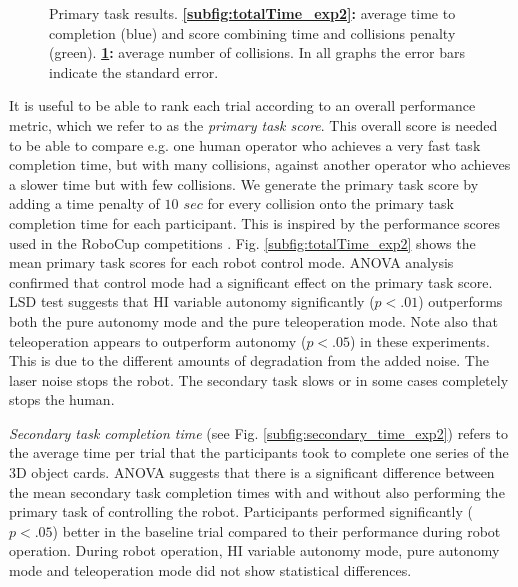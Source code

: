 \documentclass[a4paper,12pt,oneside,openright]{bhamthesis}
\begin{document}
\begin{figure}
\begin{subfigure}[b]{0.49\textwidth}
			\caption{}
			\label{subfig:totalCollisions_exp2}
		\end{subfigure}
		\hfill
		\caption{Primary task results. \textbf{\ref{subfig:totalTime_exp2}:} average time to completion (blue) and score combining time and collisions penalty (green). \textbf{\ref{subfig:totalCollisions_exp2}:} average number of collisions. In all graphs the error bars indicate the standard error.}
		\label{fig:time_collisions_exp2}
	\end{figure}
	
It is useful to be able to rank each trial according to an overall performance metric, which we refer to as the \textit{primary task score}. This overall score is needed to be able to compare e.g. one human operator who achieves a very fast task completion time, but with many collisions, against another operator who achieves a slower time but with few collisions. We generate the primary task score by adding a time penalty of \textit{$10$ $sec$} for every collision onto the primary task completion time for each participant. This is inspired by the performance scores used in the RoboCup competitions \citep{Jacoff2003a}. Fig. \ref{subfig:totalTime_exp2} shows the mean primary task scores for each robot control mode. ANOVA analysis confirmed that control mode had a significant effect on the primary task score. LSD test suggests that HI variable autonomy significantly (\textit{$p <.01$}) outperforms both the pure autonomy mode and the pure teleoperation mode. Note also that teleoperation appears to outperform autonomy (\textit{$p <.05$}) in these experiments. This is due to the different amounts of degradation from the added noise. The laser noise stops the robot. The secondary task slows or in some cases completely stops the human.

\textit{Secondary task completion time} (see Fig. \ref{subfig:secondary_time_exp2}) refers to the average time per trial that the participants took to complete one series of the 3D object cards. ANOVA suggests that there is a significant difference between the mean secondary task completion times with and without also performing the primary task of controlling the robot. Participants performed significantly ($p < .05$) better in the baseline trial compared to their performance during robot operation. During robot operation, HI variable autonomy mode, pure autonomy mode and teleoperation mode did not show statistical differences.
\end{document}
